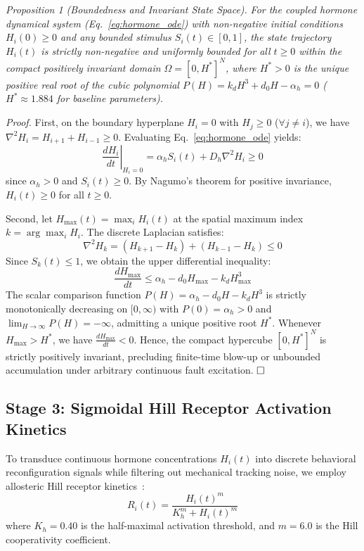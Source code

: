 \documentclass{iopjournal}
\begin{document}
\vspace{0.4em}
\noindent\textit{Proposition 1 (Boundedness and Invariant State Space).} \textit{For the coupled hormone dynamical system (Eq.~\ref{eq:hormone_ode}) with non-negative initial conditions $H_i(0) \ge 0$ and any bounded stimulus $S_i(t) \in [0, 1]$, the state trajectory $H_i(t)$ is strictly non-negative and uniformly bounded for all $t \ge 0$ within the compact positively invariant domain $\Omega = [0, H^*]^N$, where $H^* > 0$ is the unique positive real root of the cubic polynomial $P(H) = k_d H^3 + d_0 H - \alpha_h = 0$ ($H^* \approx 1.884$ for baseline parameters).}

\vspace{0.2em}
\noindent\textit{Proof.} First, on the boundary hyperplane $H_i = 0$ with $H_j \ge 0$ ($\forall j \neq i$), we have $\nabla^2 H_i = H_{i+1} + H_{i-1} \ge 0$. Evaluating Eq.~\ref{eq:hormone_ode} yields:
\begin{equation}
\left.\frac{dH_i}{dt}\right|_{H_i = 0} = \alpha_h S_i(t) + D_h \nabla^2 H_i \ge 0
\end{equation}
since $\alpha_h > 0$ and $S_i(t) \ge 0$. By Nagumo's theorem for positive invariance, $H_i(t) \ge 0$ for all $t \ge 0$.

Second, let $H_{\max}(t) = \max_{i} H_i(t)$ at the spatial maximum index $k = \arg\max_i H_i$. The discrete Laplacian satisfies:
\begin{equation}
\nabla^2 H_k = (H_{k+1} - H_k) + (H_{k-1} - H_k) \le 0
\end{equation}
Since $S_k(t) \le 1$, we obtain the upper differential inequality:
\begin{equation}
\frac{d H_{\max}}{dt} \le \alpha_h - d_0 H_{\max} - k_d H_{\max}^3
\end{equation}
The scalar comparison function $P(H) = \alpha_h - d_0 H - k_d H^3$ is strictly monotonically decreasing on $[0, \infty)$ with $P(0) = \alpha_h > 0$ and $\lim_{H \to \infty} P(H) = -\infty$, admitting a unique positive root $H^*$. Whenever $H_{\max} > H^*$, we have $\frac{d H_{\max}}{dt} < 0$. Hence, the compact hypercube $[0, H^*]^N$ is strictly positively invariant, precluding finite-time blow-up or unbounded accumulation under arbitrary continuous fault excitation. $\hfill\square$

\subsection{Stage 3: Sigmoidal Hill Receptor Activation Kinetics}
To transduce continuous hormone concentrations $H_i(t)$ into discrete behavioral reconfiguration signals while filtering out mechanical tracking noise, we employ allosteric Hill receptor kinetics~\cite{hill1910,marder2006}:
\begin{equation}
R_i(t) = \frac{H_i(t)^m}{K_h^m + H_i(t)^m}
\label{eq:hill_receptor}
\end{equation}
where $K_h = 0.40$ is the half-maximal activation threshold, and $m = 6.0$ is the Hill cooperativity coefficient.
\end{document}
